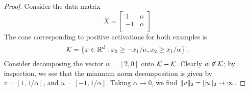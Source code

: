 \worstCaseNorm*
\begin{proof}
    Consider the data matrix
    \begin{equation}
        X =
        \begin{bmatrix}
            1   & \alpha \\
            - 1 & \alpha \\
        \end{bmatrix}
    \end{equation}
    The cone corresponding to positive activations for both examples is
    \[
        \mathcal{K} = \left\{x \in \mathbb{R}^d : x_2 \geq - x_1 / \alpha, x_2 \geq x_1 / \alpha  \right\}.
    \]
    Consider decomposing the vector \( w = [2, 0] \) onto \( \mathcal{K} - \mathcal{K} \).
    Clearly \( w \not \in \mathcal{K} \);
    by inspection, we see that the minimum norm decomposition is given by
    \( v = [1, 1/\alpha] \), and \( u = [-1, 1/\alpha] \).
    Taking \( \alpha \rightarrow 0 \), we find \( \|v\|_2 = \|u\|_2 \rightarrow \infty \).
\end{proof}

